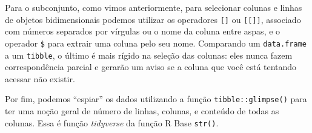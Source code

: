 \documentclass[
]{book}
\newenvironment{Shaded}{\begin{snugshade}}{\end{snugshade}}
\newcommand{\CommentTok}[1]{\textcolor[rgb]{0.37,0.37,0.37}{\textit{#1}}}
\newcommand{\DocumentationTok}[1]{\textcolor[rgb]{0.37,0.37,0.37}{\textbf{\textit{#1}}}}
\newcommand{\NormalTok}[1]{#1}
\newcommand{\SpecialCharTok}[1]{\textcolor[rgb]{0,0,0}{#1}}
\begin{document}
Para o subconjunto, como vimos anteriormente, para selecionar colunas e linhas de objetos bidimensionais podemos utilizar os operadores \texttt{{[}{]}} ou \texttt{{[}{[}{]}{]}}, associado com números separados por vírgulas ou o nome da coluna entre aspas, e o operador \texttt{\$} para extrair uma coluna pelo seu nome. Comparando um \texttt{data.frame} a um \texttt{tibble}, o último é mais rígido na seleção das colunas: eles nunca fazem correspondência parcial e gerarão um aviso se a coluna que você está tentando acessar não existir.

\begin{Shaded}
\end{Shaded}

Por fim, podemos ``espiar'' os dados utilizando a função \texttt{tibble::glimpse()} para ter uma noção geral de número de linhas, colunas, e conteúdo de todas as colunas. Essa é função \emph{tidyverse} da função R Base \texttt{str()}.
\end{document}
